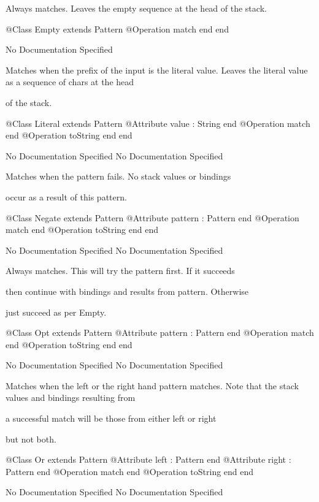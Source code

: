       Always matches. Leaves the empty sequence at the head of the stack.
\begin{Interface}
@Class Empty extends Pattern
  @Operation match end
end
\end{Interface}
No Documentation Specified

      Matches when the prefix of the input is the literal value.
      Leaves the literal value as a sequence of chars at the head

      of the stack.
\begin{Interface}
@Class Literal extends Pattern
  @Attribute value : String end
  @Operation match end
  @Operation toString end
end
\end{Interface}
No Documentation Specified
No Documentation Specified

      Matches when the pattern fails. No stack values or bindings

      occur as a result of this pattern.
\begin{Interface}
@Class Negate extends Pattern
  @Attribute pattern : Pattern end
  @Operation match end
  @Operation toString end
end
\end{Interface}
No Documentation Specified
No Documentation Specified

      Always matches. This will try the pattern first. If it succeeds

      then continue with bindings and results from pattern. Otherwise

      just succeed as per Empty.
\begin{Interface}
@Class Opt extends Pattern
  @Attribute pattern : Pattern end
  @Operation match end
  @Operation toString end
end
\end{Interface}
No Documentation Specified
No Documentation Specified

      Matches when the left or the right hand pattern matches.
      Note that the stack values and bindings resulting from

      a successful match will be those from either left or right

      but not both.
\begin{Interface}
@Class Or extends Pattern
  @Attribute left : Pattern end
  @Attribute right : Pattern end
  @Operation match end
  @Operation toString end
end
\end{Interface}
No Documentation Specified
No Documentation Specified

